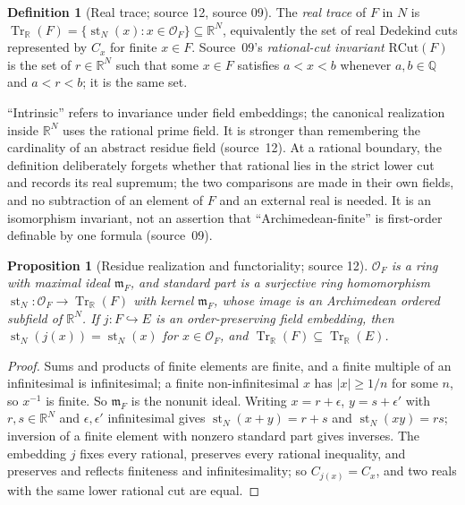 \documentclass[11pt,letterpaper]{article}
\numberwithin{equation}{section}
\newtheorem{proposition}[proposition]{Proposition}
\theoremstyle{definition}
\newtheorem{definition}[definition]{Definition}
\theoremstyle{remark}
\newcommand{\R}{\mathbb R}
\newcommand{\Q}{\mathbb Q}
\newcommand{\abs}[1]{\lvert#1\rvert}
\newcommand{\Tr}{\operatorname{Tr}_{\R}}
\newcommand{\st}{\operatorname{st}}
\begin{document}
\begin{definition}[Real trace; source 12, source 09]\label{univ:gs:def:trace}
The \emph{real trace} of $F$ in $N$ is
$\Tr(F)=\{\st_N(x):x\in\mathcal O_F\}\subseteq\R^N$, equivalently the set of real Dedekind
cuts represented by $C_x$ for finite $x\in F$. Source~09's \emph{rational-cut invariant}
$\mathrm{RCut}(F)$ is the set of $r\in\R^N$ such that some $x\in F$ satisfies $a<x<b$
whenever $a,b\in\Q$ and $a<r<b$; it is the same set.
\end{definition}

``Intrinsic'' refers to invariance under field embeddings; the canonical realization inside
$\R^N$ uses the rational prime field. It is stronger than remembering the cardinality of an
abstract residue field (source~12). At a rational boundary, the definition deliberately
forgets whether that rational lies in the strict lower cut and records its real supremum;
the two comparisons are made in their own fields, and no subtraction of an element of $F$
and an external real is needed. It is an isomorphism invariant, not an assertion that
``Archimedean-finite'' is first-order definable by one formula (source~09).

\begin{proposition}[Residue realization and functoriality; source 12]\label{univ:gs:prop:tracefunctor}
$\mathcal O_F$ is a ring with maximal ideal $\mathfrak m_F$, and standard part is a surjective
ring homomorphism $\st_N:\mathcal O_F\to\Tr(F)$ with kernel $\mathfrak m_F$, whose image is an
Archimedean ordered subfield of $\R^N$. If $j:F\hookrightarrow E$ is an order-preserving field
embedding, then $\st_N(j(x))=\st_N(x)$ for $x\in\mathcal O_F$, and $\Tr(F)\subseteq\Tr(E)$.
\end{proposition}
\begin{proof}
Sums and products of finite elements are finite, and a finite multiple of an infinitesimal
is infinitesimal; a finite non-infinitesimal $x$ has $\abs x\ge1/n$ for some $n$, so $x^{-1}$
is finite. So $\mathfrak m_F$ is the nonunit ideal. Writing $x=r+\epsilon$, $y=s+\epsilon'$
with $r,s\in\R^N$ and $\epsilon,\epsilon'$ infinitesimal gives $\st_N(x+y)=r+s$ and
$\st_N(xy)=rs$; inversion of a finite element with nonzero standard part gives inverses. The
embedding $j$ fixes every rational, preserves every rational inequality, and preserves and
reflects finiteness and infinitesimality; so $C_{j(x)}=C_x$, and two reals with the same lower
rational cut are equal.
\end{proof}
\end{document}
